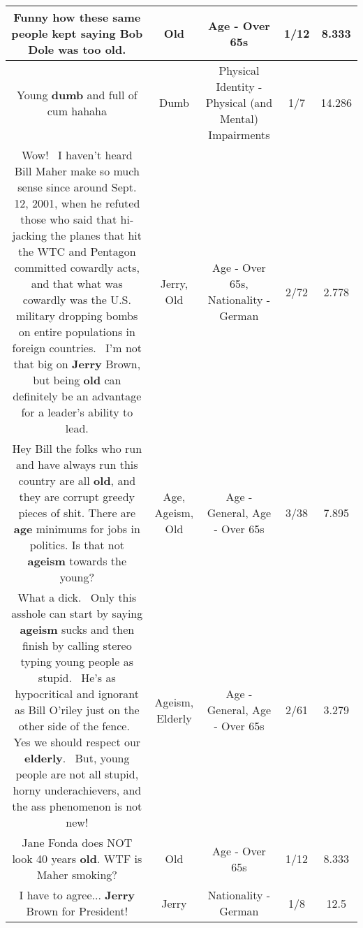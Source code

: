 \documentclass[11pt]{article}
\newlength\mylength
\begin{document}
\begin{center}
\begin{longtable}{|C{.65\mylength}|C{.30\mylength}|C{.12\mylength}|C{.12\mylength}|C{.12\mylength}|}
  \small Funny how these same people kept saying Bob Dole was too \textbf{old}.\normalsize   & Old & Age - Over 65s & 1/12 & 8.333 \\  \hline
  \small Young \textbf{dumb} and full of cum hahaha\normalsize   & Dumb & Physical Identity - Physical (and Mental) Impairments & 1/7 & 14.286 \\  \hline
  \small Wow!  I haven't heard Bill Maher make so much sense since around Sept. 12, 2001, when he refuted those who said that hi-jacking the planes that hit the WTC and Pentagon committed cowardly acts, and that what was cowardly was the U.S. military dropping bombs on entire populations in foreign countries.  I'm not that big on \textbf{Jerry} Brown, but being \textbf{old} can definitely be an advantage for a leader's ability to lead.\normalsize   & Jerry, Old & Age - Over 65s, Nationality - German & 2/72 & 2.778 \\  \hline
  \small Hey Bill the folks who run and have always run this country are all \textbf{old}, and they are corrupt greedy pieces of shit. There are \textbf{age} minimums for jobs in politics. Is that not \textbf{ageism} towards the young?\normalsize   & Age, Ageism, Old & Age - General, Age - Over 65s & 3/38 & 7.895 \\  \hline
  \small What a dick.  Only this asshole can start by saying \textbf{ageism} sucks and then finish by calling stereo typing young people as stupid.  He's as hypocritical and ignorant as Bill O'riley just on the other side of the fence.  Yes we should respect our \textbf{elderly}.  But, young people are not all stupid, horny underachievers, and the ass phenomenon is not new!\normalsize   & Ageism, Elderly & Age - General, Age - Over 65s & 2/61 & 3.279 \\  \hline
  \small Jane Fonda does NOT look 40 years \textbf{old}. WTF is Maher smoking?\normalsize   & Old & Age - Over 65s & 1/12 & 8.333 \\  \hline
  \small I have to agree... \textbf{Jerry} Brown for President!\normalsize   & Jerry & Nationality - German & 1/8 & 12.5 \\  \hline

\end{longtable}
\end{center}
\end{document}
